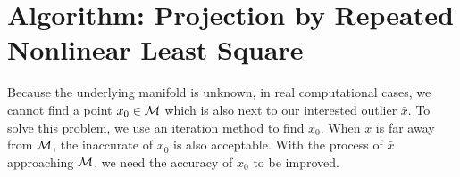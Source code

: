 \documentclass{article}
\newtheorem{theorem}{Theorem}[section]
\newtheorem{assumption}[theorem]{Assumption}
\theoremstyle{remark}
\begin{document}
%
%

\section{Algorithm: Projection by Repeated Nonlinear Least Square}\label{nonlinear projection}
Because the underlying manifold is unknown, in real computational cases,  we cannot find a point $x_0\in \cal M$ which is also next to our interested outlier $\bar{x}$. To solve this problem, we use an iteration method to find $x_0$. When $\bar{x}$ is far away from $\cal M$, the inaccurate of $x_0$ is also acceptable. With the process of $\bar{x}$ approaching $\cal M$, we need the accuracy of  $x_0$ to be improved.
\end{document}
